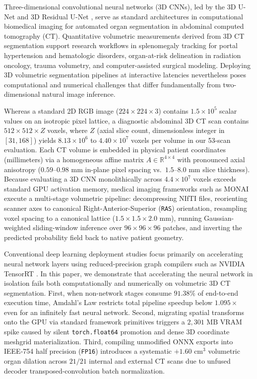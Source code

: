 \documentclass[10pt,twocolumn]{article}
\begin{document}
Three-dimensional convolutional neural networks (3D CNNs), led by the 3D U-Net \cite{cicek2016} and 3D Residual U-Net \cite{kerfoot2019}, serve as standard architectures in computational biomedical imaging for automated organ segmentation in abdominal computed tomography (CT). Quantitative volumetric measurements derived from 3D CT segmentation support research workflows in splenomegaly tracking for portal hypertension and hematologic disorders, organ-at-risk delineation in radiation oncology, trauma volumetry, and computer-assisted surgical modeling. Deploying 3D volumetric segmentation pipelines at interactive latencies nevertheless poses computational and numerical challenges that differ fundamentally from two-dimensional natural image inference.

Whereas a standard 2D RGB image ($224 \times 224 \times 3$) contains $1.5 \times 10^5$ scalar values on an isotropic pixel lattice, a diagnostic abdominal 3D CT scan contains $512 \times 512 \times Z$ voxels, where $Z$ (axial slice count, dimensionless integer in $[31, 168]$) yields $8.13 \times 10^6$ to $4.40 \times 10^7$ voxels per volume in our 53-scan evaluation. Each CT volume is embedded in physical patient coordinates (millimeters) via a homogeneous affine matrix $A \in \mathbb{R}^{4 \times 4}$ with pronounced axial anisotropy ($0.59\text{--}0.98\text{ mm}$ in-plane pixel spacing vs.\ $1.5\text{--}8.0\text{ mm}$ slice thickness). Because evaluating a 3D CNN monolithically across $4.4 \times 10^7$ voxels exceeds standard GPU activation memory, medical imaging frameworks such as MONAI \cite{cardoso2022,monaibundle2024} execute a multi-stage volumetric pipeline: decompressing NIfTI files, reorienting scanner axes to canonical Right-Anterior-Superior (\texttt{RAS}) orientation, resampling voxel spacing to a canonical lattice ($1.5 \times 1.5 \times 2.0\text{ mm}$), running Gaussian-weighted sliding-window inference over $96 \times 96 \times 96$ patches, and inverting the predicted probability field back to native patient geometry.

Conventional deep learning deployment studies focus primarily on accelerating neural network layers using reduced-precision graph compilers such as NVIDIA TensorRT \cite{tensorrt2025}. In this paper, we demonstrate that accelerating the neural network in isolation fails both computationally and numerically on volumetric 3D CT segmentation. First, when non-network stages consume $91.38\%$ of end-to-end execution time, Amdahl's Law \cite{amdahl1967} restricts total pipeline speedup below $1.095\times$ even for an infinitely fast neural network. Second, migrating spatial transforms onto the GPU via standard framework primitives triggers a $2,301\text{ MB}$ VRAM spike caused by silent \texttt{torch.float64} promotion and dense 3D coordinate meshgrid materialization. Third, compiling unmodified ONNX exports into IEEE-754 half precision (\texttt{FP16}) introduces a systematic $+1.60\text{ cm}^3$ volumetric organ dilation across $21/21$ internal and external CT scans due to unfused decoder transposed-convolution batch normalization.
\end{document}
